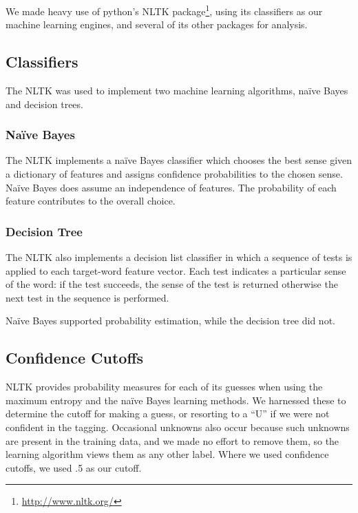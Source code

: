 \documentclass{article}
\newcommand{\naive}{na\"ive}
\newcommand{\Naive}{Na\"ive}
\begin{document}
We made heavy use of python's NLTK
package\footnote{\url{http://www.nltk.org/}}, using its classifiers as our
machine learning engines, and several of its other packages for analysis.

\subsection{Classifiers}

The NLTK was used to implement two machine learning algorithms, \naive{} Bayes and
decision trees.  

\subsubsection{\Naive{} Bayes}

The NLTK implements a \naive{} Bayes classifier which chooses the best sense given a
dictionary of features and assigns confidence probabilities to the chosen
sense. \Naive{} Bayes does assume an independence of features. The probability of
each feature contributes to the overall choice.

\subsubsection{Decision Tree}

The NLTK also implements a decision list classifier in which a sequence of
tests is applied to each target-word feature vector. Each test indicates a
particular sense of the word: if the test succeeds, the sense of the test is
returned otherwise the next test in the sequence is performed.

\Naive{} Bayes supported probability estimation, while the decision tree did not.

\subsection{Confidence Cutoffs}

NLTK provides probability measures for each of its guesses when using the
maximum entropy and the \naive{} Bayes learning methods.  We harnessed these to
determine the cutoff for making a guess, or resorting to a ``U'' if we were not
confident in the tagging.  Occasional unknowns also occur because such unknowns
are present in the training data, and we made no effort to remove them, so the
learning algorithm views them as any other label.  Where we used confidence
cutoffs, we used .5 as our cutoff.
\end{document}
